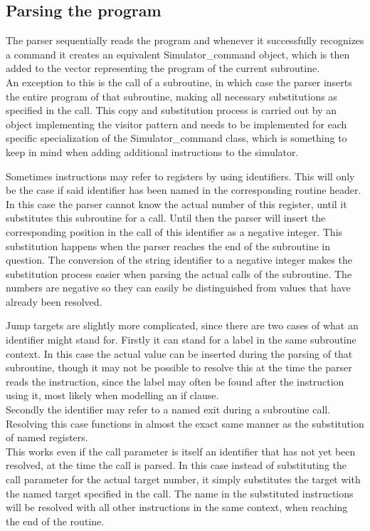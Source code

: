 \subsection{Parsing the program}
The parser sequentially reads the program and whenever it successfully recognizes a command it creates an equivalent Simulator\_command object, which is then added to the vector representing the program of the current subroutine.\\
An exception to this is the call of a subroutine, in which case the parser inserts the entire program of that subroutine, making all necessary substitutions as specified in the call. This copy and substitution process is carried out by an object implementing the visitor pattern and needs to be implemented for each specific specialization of the Simulator\_command class, which is something to keep in mind when adding additional instructions to the simulator.

Sometimes instructions may refer to registers by using identifiers. This will only be the case if said identifier has been named in the corresponding routine header. In this case the parser cannot know the actual number of this register, until it substitutes this subroutine for a call. Until then the parser will insert the corresponding position in the call of this identifier as a negative integer. This substitution happens when the parser reaches the end of the subroutine in question. The conversion of the string identifier to a negative integer makes the substitution process easier when parsing the actual calls of the subroutine. The numbers are negative so they can easily be distinguished from values that have already been resolved.

Jump targets are slightly more complicated, since there are two cases of what an identifier might stand for. Firstly it can stand for a label in the same subroutine context. In this case the actual value can be inserted during the parsing of that subroutine, though it may not be possible to resolve this at the time the parser reads the instruction, since the label may often be found after the instruction using it, most likely when modelling an if clause.\\
Secondly the identifier may refer to a named exit during a subroutine call. Resolving this case functions in almost the exact same manner as the substitution of named registers.\\
This works even if the call parameter is itself an identifier that has not yet been resolved, at the time the call is parsed. In this case instead of substituting the call parameter for the actual target number, it simply substitutes the target with the named target specified in the call. The name in the substituted instructions will be resolved with all other instructions in the same context, when reaching the end of the routine.


